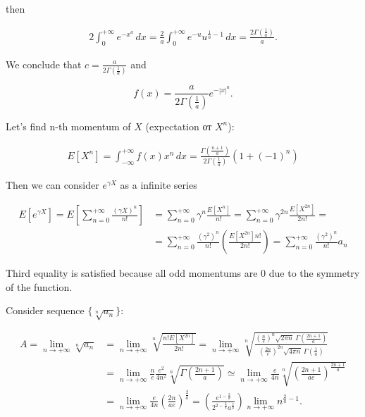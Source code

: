 \documentclass[12pt, a4paper]{article}
\theoremstyle{remark}
\newcommand{\expx}[1]{e^{-|x|^{#1}}}
\newcommand{\expxpoz}[1]{e^{-x^{#1}}}
\newcommand{\infint}[1]{\int_{-\infty}^{+\infty} #1 \, dx}
\newcommand{\infintpoz}[1]{\int_{0}^{+\infty} #1 \, dx}
\begin{document}
then

\begin{align*}
    2\infintpoz{\expxpoz{a}} = \frac{2}{a} \infintpoz{e^{-u}u^{\frac{1}{a} - 1}} = \frac{2\Gamma(\frac{1}{a})}{a}.
\end{align*}

We conclude that $c = \frac{a}{2\Gamma(\frac{1}{a})}
$ and 

$$f(x) = \frac{a}{2\Gamma(\frac{1}{a})} \expx{a}.$$

Let's find n-th momentum of $X$ (expectation от $X^n$): 

\begin{align*}
    E[X^n] = \infint{f(x) x^n} = \frac{\Gamma(\frac{n + 1}{a})}{2\Gamma(\frac{1}{a})} (1 + (-1)^n)
\end{align*}

Then we can consider $e^{\gamma X}$ as a infinite series

\begin{align*}
    E[e^{\gamma X}] = E\left[\sum_{n = 0}^{+\infty}\frac{(\gamma X)^n}{n!}\right] &= \sum_{n = 0}^{+\infty}\gamma^n\frac{E[X^n]}{n!} = \sum_{n = 0}^{+\infty}\gamma^{2n}\frac{E[X^{2n}]}{2n!} =\\
    &= \sum_{n = 0}^{+\infty}\frac{(\gamma^2)^{n}}{n!}\left(\frac{E[X^{2n}]n!}{2n!}\right) = \sum_{n = 0}^{+\infty}\frac{(\gamma^2)^{n}}{n!} a_n
\end{align*}

Third equality is satisfied because all odd momentums are 0 due to the symmetry of the function.

Consider sequence $\{\sqrt[n]{a_n}\}$:

\begin{align*}
    A = \lim_{n \to +\infty} \sqrt[n]{a_n} &= \lim_{n \to +\infty} \sqrt[n]{\frac{n! E[X^{2n}]}{2n!}} = 
    \lim_{n \to +\infty} \sqrt[n]{
        \frac{
            \left(\frac{n}{e}\right)^n \sqrt{2\pi n} \
            \Gamma\left(\frac{2n + 1}{a}\right)}{
                \left(\frac{2n}{e}\right)^{2n} \sqrt{4\pi n}\ \Gamma\left(\frac{1}{a}\right)}
        }\\
    &= \lim_{n \to +\infty} \frac{n}{e} \frac{e^2}{4n^2} \sqrt[n]{\Gamma\left(\frac{2n + 1}{a}\right)} \simeq \lim_{n \to +\infty}  \frac{e}{4n} \sqrt[n]{\left(\frac{2n + 1}{ae}\right)^{\frac{2n + 1}{a}}} \\
    &= \lim_{n \to +\infty} \frac{e}{4n} \left(\frac{2n}{ae}\right)^{\frac{2}{a}} = \left(\frac{e^{1 - \frac{2}{a}}}{2^{2 - \frac{2}{a}} a^\frac{2}{a}}\right) \lim_{n \to +\infty} n^{\frac{2}{a} - 1}.
\end{align*}
\end{document}
